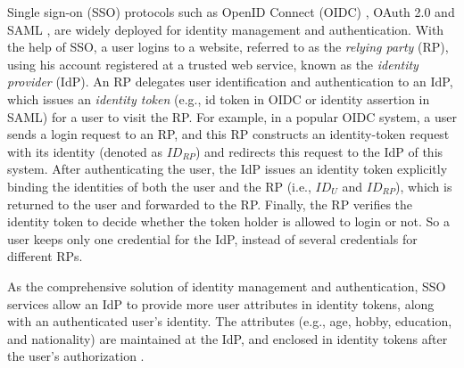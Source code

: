 Single sign-on (SSO) protocols such as OpenID Connect (OIDC) \cite{OpenIDConnect}, OAuth 2.0 \cite{rfc6749} and SAML \cite{SAML,SAMLIdentifier},
 are widely deployed for identity management and authentication.
 With the help of SSO,
  a user logins to a website, referred to as the \emph{relying party} (RP), using his account registered at a trusted web service,
   known as the \emph{identity provider} (IdP).
An RP delegates user identification and authentication to an IdP,
    which issues an \emph{identity token} (e.g., id token in OIDC or identity assertion in SAML) for a user to visit the RP. %
%
%
For example, in a popular OIDC system,
     a user sends a login request to an RP,
and this RP constructs an identity-token request with its identity (denoted as $ID_{RP}$) and redirects this request to the IdP of this system.
After authenticating the user,
 the IdP issues an identity token explicitly binding the identities of both the user and the RP (i.e., $ID_U$ and $ID_{RP}$),
    which is returned to the user and forwarded to the RP.
Finally, the RP verifies the identity token to decide whether the token holder is allowed to login or not.
So a user keeps only one credential for the IdP, instead of several credentials for different RPs.

As the comprehensive solution of identity management and authentication,
    SSO services allow an IdP to provide more user attributes in identity tokens,
        along with an authenticated user's identity.
The attributes (e.g., age, hobby, education, and nationality) are maintained at the IdP,
    and enclosed in identity tokens after the user's authorization \cite{OpenIDConnect,rfc6749}.

